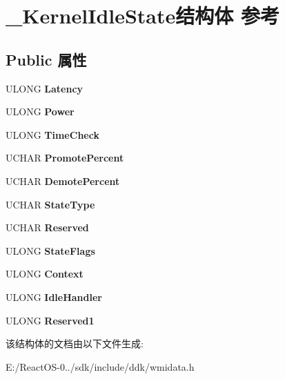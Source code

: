 \hypertarget{struct___kernel_idle_state}{}\section{\+\_\+\+Kernel\+Idle\+State结构体 参考}
\label{struct___kernel_idle_state}
\subsection*{Public 属性}
\begin{DoxyCompactItemize}
\item 
\mbox{\label{struct___kernel_idle_state_a1ca222c0ee8998653da41cdae0af9779}} 
U\+L\+O\+NG {\bfseries Latency}
\item 
\mbox{\label{struct___kernel_idle_state_a583bdc632464411658cafb6c06fe0e25}} 
U\+L\+O\+NG {\bfseries Power}
\item 
\mbox{\label{struct___kernel_idle_state_a84a9c696166c6a256bfea64ae9df38e8}} 
U\+L\+O\+NG {\bfseries Time\+Check}
\item 
\mbox{\label{struct___kernel_idle_state_a79a2f21f1c209eda36b13b9c5f95e6ee}} 
U\+C\+H\+AR {\bfseries Promote\+Percent}
\item 
\mbox{\label{struct___kernel_idle_state_a667436465caeee4a5e08949cf8f4e7d7}} 
U\+C\+H\+AR {\bfseries Demote\+Percent}
\item 
\mbox{\label{struct___kernel_idle_state_af6a078d700d4f19372d0e29e03fddeea}} 
U\+C\+H\+AR {\bfseries State\+Type}
\item 
\mbox{\label{struct___kernel_idle_state_ae126e2d34d12ed53b4aa26dbc06a491c}} 
U\+C\+H\+AR {\bfseries Reserved}
\item 
\mbox{\label{struct___kernel_idle_state_ab94ee0f01041daeef75f63ed72172513}} 
U\+L\+O\+NG {\bfseries State\+Flags}
\item 
\mbox{\label{struct___kernel_idle_state_a0c969e446737b72da97f765f0582002a}} 
U\+L\+O\+NG {\bfseries Context}
\item 
\mbox{\label{struct___kernel_idle_state_aafdf6b00b26e62f3fcfd60db9585f41f}} 
U\+L\+O\+NG {\bfseries Idle\+Handler}
\item 
\mbox{\label{struct___kernel_idle_state_adf0cdf562cecac9bb62f27e61831e94a}} 
U\+L\+O\+NG {\bfseries Reserved1}
\end{DoxyCompactItemize}


该结构体的文档由以下文件生成\+:\begin{DoxyCompactItemize}
\item 
E\+:/\+React\+O\+S-\/0../sdk/include/ddk/wmidata.\+h\end{DoxyCompactItemize}
